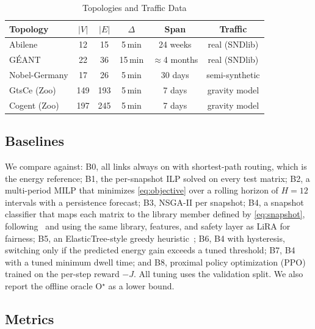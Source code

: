 \documentclass[journal]{IEEEtran}
\begin{document}
\begin{table}[t]
\centering
\caption{Topologies and Traffic Data}
\label{tab:datasets}
\footnotesize
\setlength{\tabcolsep}{3pt}
\begin{tabular}{@{}lccccc@{}}
\toprule
Topology & $|V|$ & $|E|$ & $\Delta$ & Span & Traffic \\
\midrule
Abilene & 12 & 15 & 5\,min & 24 weeks & real (SNDlib) \\
G\'{E}ANT & 22 & 36 & 15\,min & $\approx$4 months & real (SNDlib) \\
Nobel-Germany & 17 & 26 & 5\,min & 30 days & semi-synthetic \\
GtsCe (Zoo) & 149 & 193 & 5\,min & 7 days & gravity model \\
Cogent (Zoo) & 197 & 245 & 5\,min & 7 days & gravity model \\
\bottomrule
\end{tabular}
\end{table}

\subsection{Baselines}

We compare against: B0, all links always on with shortest-path routing, which is the energy reference; B1, the per-snapshot ILP solved on every test matrix; B2, a multi-period MILP that minimizes \eqref{eq:objective} over a rolling horizon of $H=12$ intervals with a persistence forecast; B3, NSGA-II per snapshot; B4, a snapshot classifier that maps each matrix to the library member defined by \eqref{eq:snapshot}, following~\cite{gomezdelahiz2025noms,gomezdelahiz2026tgcn} and using the same library, features, and safety layer as LiRA for fairness; B5, an ElasticTree-style greedy heuristic~\cite{heller2010elastictree}; B6, B4 with hysteresis, switching only if the predicted energy gain exceeds a tuned threshold; B7, B4 with a tuned minimum dwell time; and B8, proximal policy optimization (PPO)~\cite{schulman2017ppo} trained on the per-step reward $-J$. All tuning uses the validation split. We also report the offline oracle O$^\star$ as a lower bound.

\subsection{Metrics}
\end{document}
